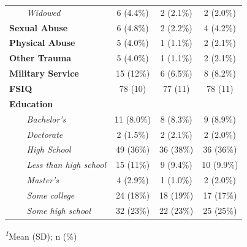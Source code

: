 \begin{table}[t]
\begin{tabular*}{\linewidth}{@{\extracolsep{\fill}}lccc}
{\itshape     Widowed} & 6 (4.4\%) & 2 (2.1\%) & 2 (2.0\%) \\ 
{\bfseries Sexual Abuse} & 6 (4.8\%) & 2 (2.2\%) & 4 (4.2\%) \\ 
{\bfseries Physical Abuse} & 5 (4.0\%) & 1 (1.1\%) & 2 (2.1\%) \\ 
{\bfseries Other Trauma} & 5 (4.0\%) & 1 (1.1\%) & 2 (2.1\%) \\ 
{\bfseries Military Service} & 15 (12\%) & 6 (6.5\%) & 8 (8.2\%) \\ 
{\bfseries FSIQ} & 78 (10) & 77 (11) & 78 (11) \\ 
{\bfseries Education} &  &  &  \\ 
{\itshape     Bachelor's} & 11 (8.0\%) & 8 (8.3\%) & 9 (8.9\%) \\ 
{\itshape     Doctorate} & 2 (1.5\%) & 2 (2.1\%) & 2 (2.0\%) \\ 
{\itshape     High School} & 49 (36\%) & 36 (38\%) & 36 (36\%) \\ 
{\itshape     Less than high school} & 15 (11\%) & 9 (9.4\%) & 10 (9.9\%) \\ 
{\itshape     Master's} & 4 (2.9\%) & 1 (1.0\%) & 2 (2.0\%) \\ 
{\itshape     Some college} & 24 (18\%) & 18 (19\%) & 17 (17\%) \\ 
{\itshape     Some high school} & 32 (23\%) & 22 (23\%) & 25 (25\%) \\ 
\bottomrule
\end{tabular*}
\begin{minipage}{\linewidth}
\textsuperscript{\textit{1}}Mean (SD); n (\%)\\
\end{minipage}
\end{table}

